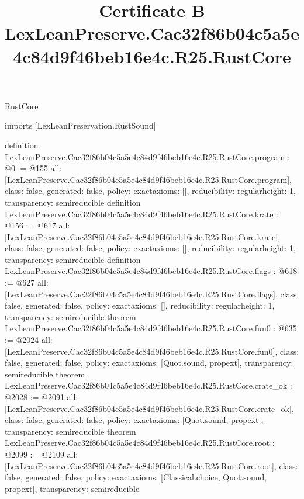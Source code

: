 \begin{lexlean}{RustCore}
\title{Certificate B LexLeanPreserve.Cac32f86b04c5a5e4c84d9f46beb16e4c.R25.RustCore}
\begin{coremodule}
imports [LexLeanPreservation.RustSound]

definition LexLeanPreserve.Cac32f86b04c5a5e4c84d9f46beb16e4c.R25.RustCore.program : @0 := @155 {
  all: [LexLeanPreserve.Cac32f86b04c5a5e4c84d9f46beb16e4c.R25.RustCore.program],
  class: false,
  generated: false,
  policy: exact{axioms: []},
  reducibility: regular{height: 1},
  transparency: semireducible
}
definition LexLeanPreserve.Cac32f86b04c5a5e4c84d9f46beb16e4c.R25.RustCore.krate : @156 := @617 {
  all: [LexLeanPreserve.Cac32f86b04c5a5e4c84d9f46beb16e4c.R25.RustCore.krate],
  class: false,
  generated: false,
  policy: exact{axioms: []},
  reducibility: regular{height: 1},
  transparency: semireducible
}
definition LexLeanPreserve.Cac32f86b04c5a5e4c84d9f46beb16e4c.R25.RustCore.flags : @618 := @627 {
  all: [LexLeanPreserve.Cac32f86b04c5a5e4c84d9f46beb16e4c.R25.RustCore.flags],
  class: false,
  generated: false,
  policy: exact{axioms: []},
  reducibility: regular{height: 1},
  transparency: semireducible
}
theorem LexLeanPreserve.Cac32f86b04c5a5e4c84d9f46beb16e4c.R25.RustCore.fun0 : @635 := @2024 {
  all: [LexLeanPreserve.Cac32f86b04c5a5e4c84d9f46beb16e4c.R25.RustCore.fun0],
  class: false,
  generated: false,
  policy: exact{axioms: [Quot.sound, propext]},
  transparency: semireducible
}
theorem LexLeanPreserve.Cac32f86b04c5a5e4c84d9f46beb16e4c.R25.RustCore.crate_ok : @2028 := @2091 {
  all: [LexLeanPreserve.Cac32f86b04c5a5e4c84d9f46beb16e4c.R25.RustCore.crate_ok],
  class: false,
  generated: false,
  policy: exact{axioms: [Quot.sound, propext]},
  transparency: semireducible
}
theorem LexLeanPreserve.Cac32f86b04c5a5e4c84d9f46beb16e4c.R25.RustCore.root : @2099 := @2109 {
  all: [LexLeanPreserve.Cac32f86b04c5a5e4c84d9f46beb16e4c.R25.RustCore.root],
  class: false,
  generated: false,
  policy: exact{axioms: [Classical.choice, Quot.sound, propext]},
  transparency: semireducible
}


\end{coremodule}
\end{lexlean}
